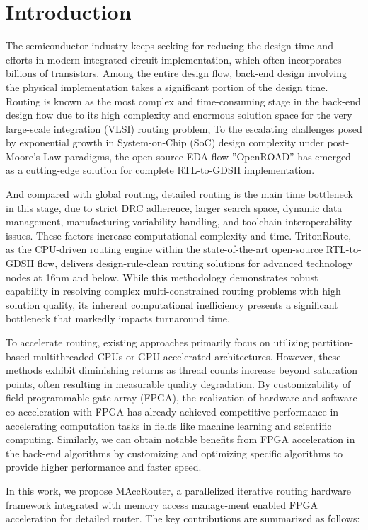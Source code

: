 \section{Introduction}
The semiconductor industry keeps seeking for reducing the design time and efforts in modern integrated circuit implementation, which often incorporates billions of transistors. 
Among the entire design flow, back-end design involving the physical implementation takes a significant portion of the design time.
Routing is known as the most complex and time-consuming stage in the back-end design flow due to its high complexity and enormous solution space for the very large-scale integration (VLSI) routing problem,
To the escalating challenges posed by exponential growth in System-on-Chip (SoC) design complexity under post-Moore's Law paradigms, the open-source EDA flow ''OpenROAD'' has emerged as a cutting-edge solution for complete RTL-to-GDSII implementation. 


And compared with global routing, detailed routing is the main time bottleneck in this stage, due to strict DRC adherence, larger search space, dynamic data management, manufacturing variability handling, and toolchain interoperability issues. These factors increase computational complexity and time.
TritonRoute, as the CPU-driven routing engine within the state-of-the-art open-source RTL-to-GDSII flow, delivers design-rule-clean routing solutions for advanced technology nodes at 16nm and below. 
While this methodology demonstrates robust capability in resolving complex multi-constrained routing problems with high solution quality, its inherent computational inefficiency presents a significant bottleneck that markedly impacts turnaround time.

To accelerate routing, existing approaches primarily focus on utilizing partition-based multithreaded CPUs or GPU-accelerated architectures. 
However, these methods exhibit diminishing returns as thread counts increase beyond saturation points, often resulting in measurable quality degradation. 
By customizability of field-programmable gate array (FPGA), the realization of hardware and software co-acceleration with FPGA has already achieved competitive performance in accelerating computation tasks in fields like machine learning and scientific computing.
Similarly, we can obtain notable benefits from FPGA acceleration in the back-end algorithms by customizing and optimizing specific algorithms to provide higher performance and faster speed.


In this work, we propose MAccRouter, a parallelized iterative routing hardware framework integrated with memory access manage-ment enabled FPGA acceleration for detailed router. The key contributions are summarized as follows:

